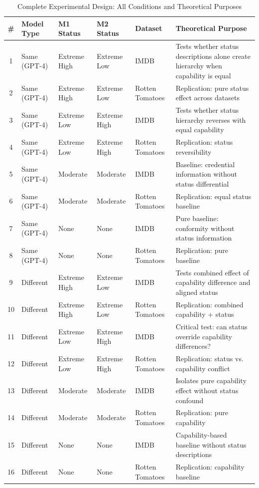 \begin{table}[htbp]
\centering
\caption{Complete Experimental Design: All Conditions and Theoretical Purposes}
\label{tab:full_design}
\scriptsize
\begin{tabular}{cp{2cm}p{1.8cm}p{1.8cm}p{2cm}p{5cm}}
\hline
\textbf{\#} & \textbf{Model Type} & \textbf{M1 Status} & \textbf{M2 Status} & \textbf{Dataset} & \textbf{Theoretical Purpose} \\
\hline
1 & Same (GPT-4) & Extreme High & Extreme Low & IMDB & Tests whether status descriptions alone create hierarchy when capability is equal \\
2 & Same (GPT-4) & Extreme High & Extreme Low & Rotten Tomatoes & Replication: pure status effect across datasets \\
3 & Same (GPT-4) & Extreme Low & Extreme High & IMDB & Tests whether status hierarchy reverses with equal capability \\
4 & Same (GPT-4) & Extreme Low & Extreme High & Rotten Tomatoes & Replication: status reversibility \\
5 & Same (GPT-4) & Moderate & Moderate & IMDB & Baseline: credential information without status differential \\
6 & Same (GPT-4) & Moderate & Moderate & Rotten Tomatoes & Replication: equal status baseline \\
7 & Same (GPT-4) & None & None & IMDB & Pure baseline: conformity without status information \\
8 & Same (GPT-4) & None & None & Rotten Tomatoes & Replication: pure baseline \\
9 & Different & Extreme High & Extreme Low & IMDB & Tests combined effect of capability difference and aligned status \\
10 & Different & Extreme High & Extreme Low & Rotten Tomatoes & Replication: combined capability + status \\
11 & Different & Extreme Low & Extreme High & IMDB & Critical test: can status override capability differences? \\
12 & Different & Extreme Low & Extreme High & Rotten Tomatoes & Replication: status vs. capability conflict \\
13 & Different & Moderate & Moderate & IMDB & Isolates pure capability effect without status confound \\
14 & Different & Moderate & Moderate & Rotten Tomatoes & Replication: pure capability \\
15 & Different & None & None & IMDB & Capability-based baseline without status descriptions \\
16 & Different & None & None & Rotten Tomatoes & Replication: capability baseline \\
\hline
\end{tabular}
\end{table}

